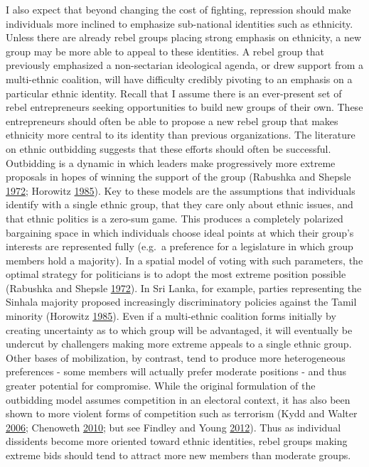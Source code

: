 \documentclass[12pt,]{book}
\theoremstyle{definition}
\theoremstyle{definition}
\theoremstyle{definition}
\theoremstyle{remark}
\begin{document}
I also expect that beyond changing the cost of fighting, repression
should make individuals more inclined to emphasize sub-national
identities such as ethnicity. Unless there are already rebel groups
placing strong emphasis on ethnicity, a new group may be more able to
appeal to these identities. A rebel group that previously emphasized a
non-sectarian ideological agenda, or drew support from a multi-ethnic
coalition, will have difficulty credibly pivoting to an emphasis on a
particular ethnic identity. Recall that I assume there is an
ever-present set of rebel entrepreneurs seeking opportunities to build
new groups of their own. These entrepreneurs should often be able to
propose a new rebel group that makes ethnicity more central to its
identity than previous organizations. The literature on ethnic
outbidding suggests that these efforts should often be successful.
Outbidding is a dynamic in which leaders make progressively more extreme
proposals in hopes of winning the support of the group (Rabushka and
Shepsle \protect\hyperlink{ref-Rabushka1972}{1972}; Horowitz
\protect\hyperlink{ref-horowitz85}{1985}). Key to these models are the
assumptions that individuals identify with a single ethnic group, that
they care only about ethnic issues, and that ethnic politics is a
zero-sum game. This produces a completely polarized bargaining space in
which individuals choose ideal points at which their group's interests
are represented fully (e.g.~a preference for a legislature in which
group members hold a majority). In a spatial model of voting with such
parameters, the optimal strategy for politicians is to adopt the most
extreme position possible (Rabushka and Shepsle
\protect\hyperlink{ref-Rabushka1972}{1972}). In Sri Lanka, for example,
parties representing the Sinhala majority proposed increasingly
discriminatory policies against the Tamil minority (Horowitz
\protect\hyperlink{ref-horowitz85}{1985}). Even if a multi-ethnic
coalition forms initially by creating uncertainty as to which group will
be advantaged, it will eventually be undercut by challengers making more
extreme appeals to a single ethnic group. Other bases of mobilization,
by contrast, tend to produce more heterogeneous preferences - some
members will actually prefer moderate positions - and thus greater
potential for compromise. While the original formulation of the
outbidding model assumes competition in an electoral context, it has
also been shown to more violent forms of competition such as terrorism
(Kydd and Walter \protect\hyperlink{ref-Kydd2006}{2006}; Chenoweth
\protect\hyperlink{ref-Chenoweth2010}{2010}; but see Findley and Young
\protect\hyperlink{ref-Findley2012a}{2012}). Thus as individual
dissidents become more oriented toward ethnic identities, rebel groups
making extreme bids should tend to attract more new members than
moderate groups.
\end{document}
